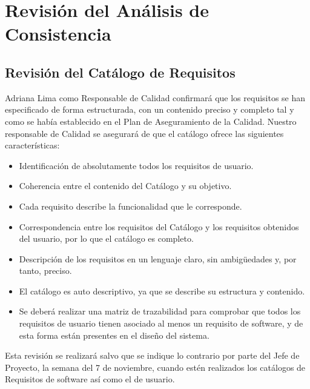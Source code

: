 \section{Revisión del Análisis de Consistencia}
\subsection{Revisión del Catálogo de Requisitos}
\par Adriana Lima como Responsable de Calidad confirmará que los requisitos se han especificado de forma estructurada, con un contenido preciso y completo tal y como se había establecido en el Plan de Aseguramiento de la Calidad. Nuestro responsable de Calidad se asegurará de que el catálogo ofrece las siguientes características:
\begin{itemize}[-]
  \item Identificación de absolutamente todos los requisitos de usuario.
  \item Coherencia entre el contenido del Catálogo y su objetivo.
  \item Cada requisito describe la funcionalidad que le corresponde.
  \item Correspondencia entre los requisitos del Catálogo y los requisitos obtenidos del usuario, por lo que el catálogo es completo.
  \item Descripción de los requisitos en un lenguaje claro, sin ambigüedades y, por tanto, preciso.
  \item El catálogo es auto descriptivo, ya que se describe su estructura y contenido.
  \item Se deberá realizar una matriz de trazabilidad para comprobar que todos los requisitos de usuario tienen asociado al menos un requisito de software, y de esta forma están presentes en el diseño del sistema.
\end{itemize}

\par Esta revisión se realizará salvo que se indique lo contrario por parte del Jefe de Proyecto, la semana del 7 de noviembre, cuando estén realizados los catálogos de Requisitos de software así como el de usuario.
